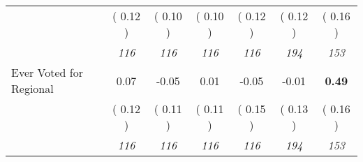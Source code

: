 \begin{tabular}{l c c c c c c}
& (     0.12 ) & (     0.10 ) & (     0.10 ) & (     0.12 ) & (     0.12 ) & (     0.16 ) \\
& \textit{ 116 } & \textit{ 116 } & \textit{ 116 } & \textit{ 116 } & \textit{ 194 } & \textit{ 153 } \\
Ever Voted for Regional &      0.07 &     -0.05 &      0.01 &     -0.05 &     -0.01 & \textbf{      0.49 } \\
& (     0.12 ) & (     0.11 ) & (     0.11 ) & (     0.15 ) & (     0.13 ) & (     0.16 ) \\
& \textit{ 116 } & \textit{ 116 } & \textit{ 116 } & \textit{ 116 } & \textit{ 194 } & \textit{ 153 } \\
\bottomrule
\end{tabular}
